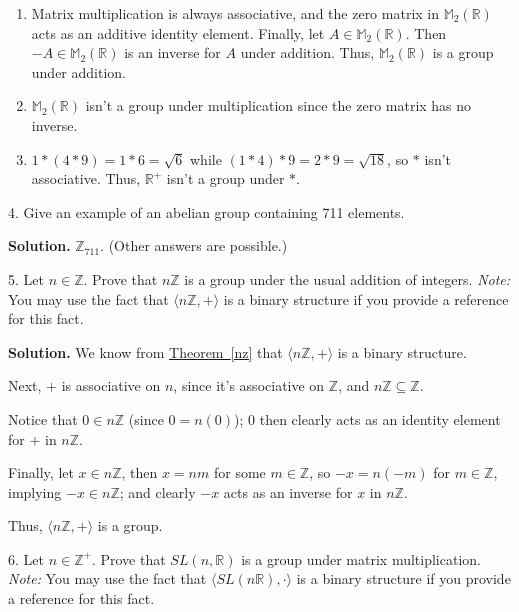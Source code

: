 \documentclass[10pt,]{book}
\theoremstyle{plain}
\theoremstyle{definition}
\theoremstyle{definition}
\theoremstyle{definition}
\theoremstyle{definition}
\numberwithin{equation}{section}
\def\Z{\mathbb{Z}}
\def\R{\mathbb{R}}
\def\M{\mathbb{M}}
\begin{document}
\begin{exerciselist}
\begin{enumerate}[label=(\alph*)]
\item\hypertarget{li-119}{}Matrix multiplication is always associative, and the zero matrix in \(\M_2(\R)\) acts as an additive identity element.            Finally, let \(A\in \M_2(\R)\).  Then \(-A\in \M_2(\R)\) is an inverse for \(A\) under addition. Thus, \(\M_2(\R)\) is a group under addition.%
\item\hypertarget{li-120}{}\(\M_2(\R)\) isn't a group under multiplication since the zero matrix has no inverse.%
\item\hypertarget{li-121}{}\(1*(4*9)=1*6=\sqrt{6}\) while \((1*4)*9=2*9=\sqrt{18}\), so \(*\) isn't associative.  Thus, \(\R^+\) isn't a group under \(*\).%
\end{enumerate}
\item[4.]\hypertarget{exercise-15}{}Give an example of an abelian group containing 711 elements.%
\par\smallskip
\par\smallskip
\noindent\textbf{Solution.}\hypertarget{solution-15}{}\quad
\(\Z_{711}\). (Other answers are possible.)%
\item[5.]\hypertarget{exercise-16}{}Let \(n\in \Z\). Prove that \(n\Z\) is a group under the usual addition of integers. \emph{Note:} You may use the fact that \(\langle n\Z,+\rangle\) is a binary structure if you provide a reference for this fact.%
\par\smallskip
\par\smallskip
\noindent\textbf{Solution.}\hypertarget{solution-16}{}\quad
We know from \hyperref[nz]{Theorem~\ref{nz}} that \(\langle n\Z,+\rangle\) is a binary structure.%
\par
Next, \(+\) is associative on \(n\), since it's associative on \(\Z\), and \(n\Z \subseteq \Z\).%
\par
Notice that \(0\in n\Z\) (since \(0=n(0)\)); 0 then clearly acts as an identity element for \(+\) in \(n\Z\).%
\par
Finally, let \(x\in n\Z\), then \(x=nm\) for some \(m\in \Z\), so \(-x=n(-m)\) for \(m\in \Z\), implying \(-x\in n\Z\); and clearly \(-x\) acts as an inverse for \(x\) in \(n\Z\).%
\par
Thus, \(\langle n\Z, +\rangle\) is a group.%
\item[6.]\hypertarget{exercise-17}{}Let \(n\in \Z^+\). Prove that \(SL(n,\R)\) is a group under matrix multiplication. \emph{Note:} You may use the fact that \(\langle SL(n\R),\cdot\rangle\) is a binary structure if you provide a reference for this fact.%
\par\smallskip

\end{exerciselist}
\end{document}
